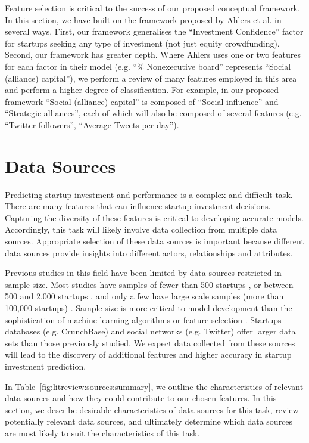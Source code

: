 \documentclass[../thesis/thesis.tex]{subfiles}
\begin{document}
Feature selection is critical to the success of our proposed conceptual framework. In this section, we have built on the framework proposed by Ahlers et al. \cite{ahlers2015} in several ways. First, our framework generalises the ``Investment Confidence'' factor for startups seeking any type of investment (not just equity crowdfunding). Second, our framework has greater depth. Where Ahlers uses one or two features for each factor in their model (e.g. ``\% Nonexecutive board'' represents ``Social (alliance) capital''), we perform a review of many features employed in this area and perform a higher degree of classification. For example, in our proposed framework ``Social (alliance) capital'' is composed of ``Social influence'' and ``Strategic alliances'', each of which will also be composed of several features (e.g. ``Twitter followers'', ``Average Tweets per day'').

\section{Data Sources}

Predicting startup investment and performance is a complex and difficult task. There are many features that can influence startup investment decisions. Capturing the diversity of these features is critical to developing accurate models. Accordingly, this task will likely involve data collection from multiple data sources. Appropriate selection of these data sources is important because different data sources provide insights into different actors, relationships and attributes.

Previous studies in this field have been limited by data sources restricted in sample size. Most studies have samples of fewer than 500 startups \cite{ahlers2015, gimmon2010}, or between 500 and 2,000 startups \cite{hoenen2014, yu2015, an2015, werth2013, croce2016}, and only a few have large scale samples (more than 100,000 startups) \cite{shan2014, cheng2016}. Sample size is more critical to model development than the sophistication of machine learning algorithms or feature selection \cite{caruana2008}. Startups databases (e.g. CrunchBase) and social networks (e.g. Twitter) offer larger data sets than those previously studied. We expect data collected from these sources will lead to the discovery of additional features and higher accuracy in startup investment prediction.

In Table~\ref{fig:litreview:sources:summary}, we outline the characteristics of relevant data sources and how they could contribute to our chosen features. In this section, we describe desirable characteristics of data sources for this task, review potentially relevant data sources, and ultimately determine which data sources are most likely to suit the characteristics of this task.
\end{document}
